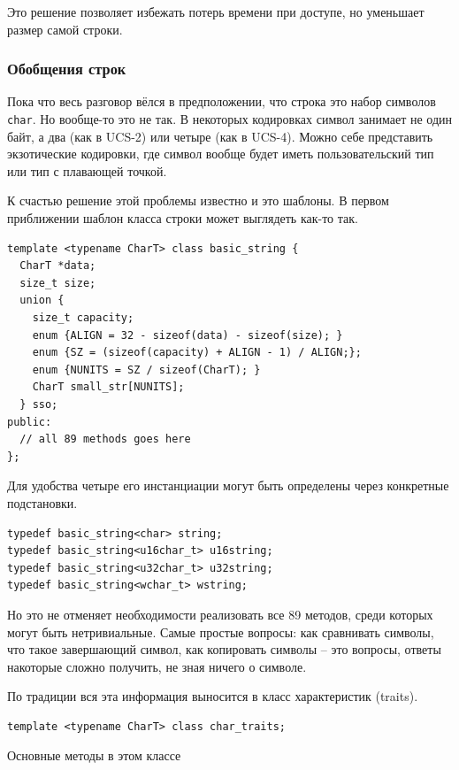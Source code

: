 \documentclass[a4paper,12pt,oneside]{article}
\begin{document}
Это решение позволяет избежать потерь времени при доступе, но уменьшает размер самой строки.

\subsubsection{Обобщения строк}\label{subsub:strtraits}

Пока что весь разговор вёлся в предположении, что строка это набор символов \lstinline!char!. Но вообще-то это не так. В некоторых кодировках символ занимает не один байт, а два (как в UCS-2) или четыре (как в UCS-4). Можно себе представить экзотические кодировки, где символ вообще будет иметь пользовательский тип или тип с плавающей точкой.

К счастью решение этой проблемы известно и это шаблоны. В первом приближении шаблон класса строки может выглядеть как-то так.

\begin{lstlisting}
template <typename CharT> class basic_string {
  CharT *data;
  size_t size;
  union {
    size_t capacity;
    enum {ALIGN = 32 - sizeof(data) - sizeof(size); }
    enum {SZ = (sizeof(capacity) + ALIGN - 1) / ALIGN;};
    enum {NUNITS = SZ / sizeof(CharT); }
    CharT small_str[NUNITS];
  } sso;
public:
  // all 89 methods goes here
};
\end{lstlisting}

Для удобства четыре его инстанциации могут быть определены через конкретные подстановки.

\begin{lstlisting}
typedef basic_string<char> string;
typedef basic_string<u16char_t> u16string;
typedef basic_string<u32char_t> u32string;
typedef basic_string<wchar_t> wstring;
\end{lstlisting}

Но это не отменяет необходимости реализовать все 89 методов, среди которых могут быть нетривиальные. Самые простые вопросы: как сравнивать символы, что такое завершающий символ, как копировать символы -- это вопросы, ответы накоторые сложно получить, не зная ничего о символе.

По традиции вся эта информация выносится в класс характеристик (traits).

\begin{lstlisting}
template <typename CharT> class char_traits;
\end{lstlisting}

Основные методы в этом классе
\end{document}
